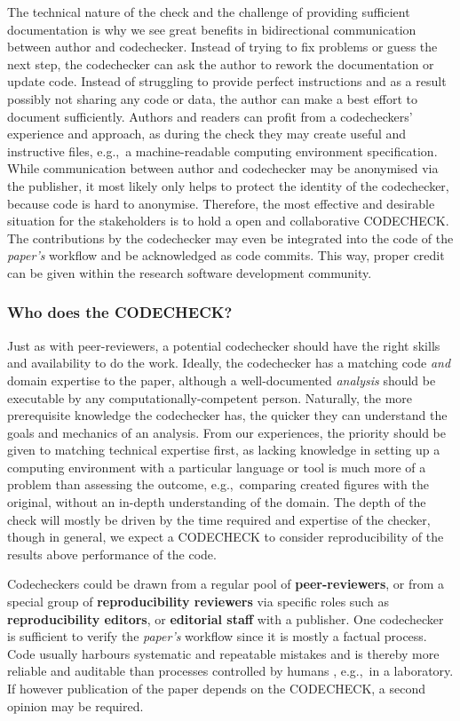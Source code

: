 \documentclass[12pt]{article}
\newcommand{\rev}[1]{\textit{#1}}
\begin{document}
The technical nature of the check and the challenge of providing sufficient documentation is why we see great benefits in bidirectional communication between author and codechecker.
Instead of trying to
fix problems or guess the next step, the codechecker can ask the author to 
rework the documentation or update code.
Instead of struggling to provide perfect instructions and as a result possibly not sharing any code or data, the author can make a best effort to document sufficiently.
Authors and readers can profit from a codecheckers' experience and approach, as during the check they may create useful and instructive files, e.g.,~a machine-readable computing environment specification.
While communication between author and codechecker may be anonymised via
the publisher, it most likely only helps to protect the identity of
the codechecker, because code is hard to anonymise.
Therefore, the most effective and desirable situation for the
stakeholders is to hold a open and collaborative CODECHECK.
The contributions by the codechecker may even be integrated into
the code of the \rev{paper's} workflow and be acknowledged as code commits. This way, 
proper credit can be given within the research software development community.


\subsubsection*{Who does the CODECHECK?}\label{who-does-the-codecheck}

Just as with peer-reviewers, a potential codechecker should have the
right skills and availability to do the work.  Ideally, the
codechecker has a matching code \emph{and} domain expertise to the
paper, although a well-documented \rev{analysis} should be executable by any
computationally-competent person. Naturally, the more
prerequisite knowledge the codechecker has, the quicker they can
understand the goals and mechanics of an analysis.  From our
experiences, the priority should be given to matching technical
expertise first, as lacking knowledge in setting up a computing
environment with a particular language or tool is much more of a
problem than assessing the outcome, e.g.,~comparing created figures
with the original, without an in-depth understanding of the domain.
The depth of the check will mostly be driven by the time required and
expertise of the checker, though in general, we expect a CODECHECK 
to consider reproducibility of the results above performance of the code.


Codecheckers could be drawn from a regular pool of
\textbf{peer-reviewers}, or from a special group of
\textbf{reproducibility reviewers} via specific roles such as
\textbf{reproducibility editors}, or \textbf{editorial staff} with a
publisher.  One codechecker is sufficient to verify the \rev{paper's} workflow since
it is mostly a factual process.  Code usually harbours systematic and
repeatable mistakes and is thereby more reliable and auditable than
processes controlled by humans \cite{tibav:42484}, e.g.,~in a
laboratory.  If however publication of the paper depends on the
CODECHECK, a second opinion may be required.
\end{document}

